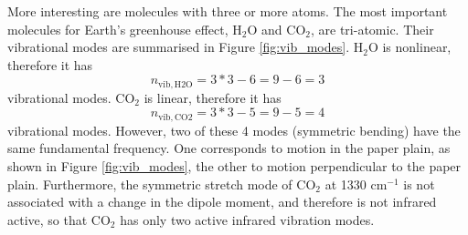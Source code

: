 More interesting are molecules with three or more atoms. The most
important molecules for Earth's greenhouse effect, 
H$_2$O and CO$_2$, are tri-atomic. Their vibrational modes are
summarised in Figure \ref{fig:vib_modes}. H$_2$O is nonlinear, therefore it has
\begin{equation}
  n_\mathrm{vib,H2O} = 3*3-6 = 9-6 = 3
\end{equation}
vibrational modes. CO$_2$ is linear, therefore it has
\begin{equation}
  n_\mathrm{vib,CO2} = 3*3-5 = 9-5 = 4
\end{equation}
vibrational modes. However, two of these 4 modes (symmetric bending)
have the same fundamental frequency. One corresponds to motion in the
paper plain, as shown in Figure \ref{fig:vib_modes}, the other to
motion perpendicular to the paper plain. Furthermore, the symmetric
stretch mode of CO$_2$ at 1330 cm$^{-1}$ is not associated with a
change in the dipole moment, and therefore is not infrared active, so
that CO$_2$ has only two active infrared vibration modes.

